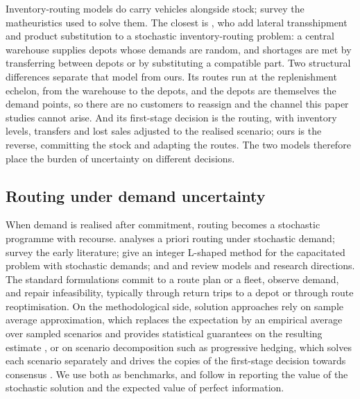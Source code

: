 \documentclass[authoryear,final,3p,times]{elsarticle}
\theoremstyle{definition}
\theoremstyle{plain}
\begin{document}
Inventory-routing models do carry vehicles alongside stock; \citet{archetti2014survey}
survey the matheuristics used to solve them. The closest is
\citet{achamrah2022spare}, who add lateral transshipment and product
substitution to a stochastic inventory-routing problem: a central warehouse
supplies depots whose demands are random, and shortages are met by transferring
between depots or by substituting a compatible part. Two structural differences
separate that model from ours. Its routes run at the replenishment echelon,
from the warehouse to the depots, and the depots are themselves the demand
points, so there are no customers to reassign and the channel this paper
studies cannot arise. And its first-stage decision is the routing, with
inventory levels, transfers and lost sales adjusted to the realised scenario;
ours is the reverse, committing the stock and adapting the routes. The two
models therefore place the burden of uncertainty on different decisions.

\subsection{Routing under demand uncertainty}
\label{subsec:stochastic_routing}

When demand is realised after commitment, routing becomes a stochastic
programme with recourse. \citet{bertsimas1992vehicle} analyses a priori
routing under stochastic demand; \citet{gendreau1996stochastic} survey the
early literature; \citet{laporte2002integer} give an integer L-shaped method
for the capacitated problem with stochastic demands; and
\citet{oyola2018stochastic} and \citet{gendreau2016future} review models and
research directions. The standard formulations commit to a route plan or a
fleet, observe demand, and repair infeasibility, typically through return
trips to a depot or through route reoptimisation. On the methodological
side, solution approaches rely on sample average approximation, which
replaces the expectation by an empirical average over sampled scenarios and
provides statistical guarantees on the resulting estimate
\citep{kleywegt2002sample}, or on scenario decomposition such as progressive
hedging, which solves each scenario separately and drives the copies of the
first-stage decision towards consensus \citep{rockafellar1991scenarios}. We
use both as benchmarks, and follow \citet{birge2011introduction} in reporting
the value of the stochastic solution and the expected value of perfect
information.
\end{document}
